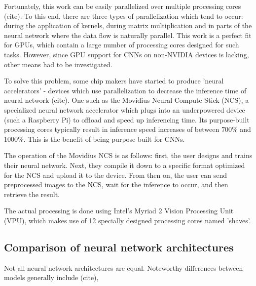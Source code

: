 Fortunately, this work can be easily parallelized over multiple processing cores {\color{red} (cite)}. To this end, there are three types of parallelization which tend to occur: during the application of kernels, during matrix multiplication and in parts of the neural network where the data flow is naturally parallel. This work is a perfect fit for GPUs, which contain a large number of processing cores designed for such tasks. However, since GPU support for CNNs on non-NVIDIA devices is lacking, other means had to be investigated.



To solve this problem, some chip makers have started to produce 'neural accelerators' - devices which use parallelization to decrease the inference time of neural network {\color{red} (cite)}. One such as the Movidius Neural Compute Stick (NCS), a specialized neural network accelerator which plugs into an underpowered device (such a Raspberry Pi) to offload and speed up inferencing time. Its purpose-built processing cores typically result in inference speed increases of between $700\%$ and $1000\%$. This is the benefit of being purpose built for CNNs.

The operation of the Movidius NCS is as follows: first, the user designs and trains their neural network. Next, they compile it down to a specific format optimized for the NCS and upload it to the device. From then on, the user can send preprocessed images to the NCS, wait for the inference to occur, and then retrieve the result.

The actual processing is done using Intel's Myriad 2 Vision Processing Unit (VPU), which makes use of 12 specially designed processing cores named 'shaves'.



\subsection{Comparison of neural network architectures}
Not all neural network architectures are equal. Noteworthy differences between models generally include {\color{red} (cite)},

